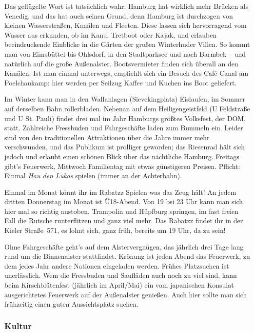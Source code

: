 Das geflügelte Wort ist tatsächlich wahr: Hamburg hat wirklich mehr Brücken als
Venedig, und das hat auch seinen Grund, denn Hamburg ist durchzogen von kleinen
Wasserstraßen, Kanälen und Fleeten. Diese lassen sich hervorragend vom Wasser
aus erkunden, ob im Kanu, Tretboot oder Kajak, und erlauben beeindruckende
Einblicke in die Gärten der großen Winterhuder Villen. So kommt man von
Eimsbüttel bis Ohlsdorf, in den Stadtparksee und nach Barmbek -- und natürlich
auf die große Außenalster. Bootsvermieter finden sich überall an den Kanälen.
Ist man einmal unterwegs, empfiehlt sich ein Besuch des Caf\'e Canal am
Poelchaukamp: hier werden per Seilzug Kaffee und Kuchen ins Boot geliefert.

Im Winter kann man in den Wallanlagen (Sievekingplatz) Eislaufen, im Sommer auf
derselben Bahn rollerbladen. Nebenan auf dem Heiligengeistfeld (U Feldstraße
und U St. Pauli) findet drei mal im Jahr Hamburgs größtes Volksfest, der DOM,
statt. Zahlreiche Fressbuden und Fahrgeschäfte laden zum Bummeln ein.  Leider
sind von den traditionellen Attraktionen über die Jahre immer mehr
verschwunden, und das Publikum ist prolliger geworden; das Riesenrad hält sich
jedoch und erlaubt einen schönen Blick über das nächtliche Hamburg. Freitags
gibt's Feuerwerk, Mittwoch Familientag mit etwas günstigeren Preisen. Pflicht:
Einmal \emph{Hau den Lukas} spielen (immer an der Achterbahn).

\begin{advice}
Einmal im Monat könnt ihr im Rabatzz Spielen was das Zeug hält! An jedem
dritten Donnerstag im Monat ist Ü18-Abend. Von 19 bsi 23 Uhr kann man sich hier
mal so richtig austoben, Trampolin und Hüpfburg springen, im fast freien Fall
die Rutsche runterflitzen und ganz viel mehr. Das Rabatzz findet ihr in der
Kieler Straße~571, es lohnt sich, ganz früh, bereits um 19 Uhr, da zu sein!
\end{advice}

Ohne Fahrgeschäfte geht's auf dem Alstervergnügen, das jährlich drei Tage lang
rund um die Binnenalster stattfindet. Krönung ist jeden Abend das Feuerwerk, zu
dem jedes Jahr andere Nationen eingeladen werden. Frühes Platzsuchen ist
unerlässlich. Wem die Fressbuden und Saufläden auch noch zu viel sind, kann
beim Kirschblütenfest (jährlich im April/Mai) ein vom japanischen Konsulat
ausgerichtetes Feuerwerk auf der Außenalster genießen. Auch hier sollte man
sich frühzeitig einen guten Aussichtsplatz suchen.

\subsubsection{Kultur}

